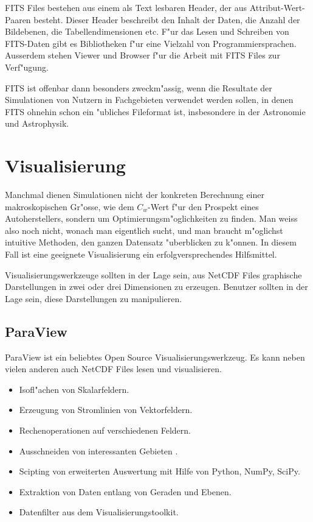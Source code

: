 FITS Files bestehen aus einem als Text lesbaren Header, der aus
Attribut-Wert-Paaren besteht.
Dieser Header beschreibt den Inhalt der Daten, die Anzahl der
Bildebenen, die Tabellendimensionen etc.
F"ur das Lesen und Schreiben von FITS-Daten gibt es Bibliotheken
f"ur eine Vielzahl von Programmiersprachen.
Ausserdem stehen Viewer und Browser f"ur die Arbeit mit FITS Files
zur Verf"ugung. 

FITS ist offenbar dann besonders zweckm"assig, wenn die Resultate
der Simulationen von Nutzern in Fachgebieten verwendet werden sollen,
in denen FITS ohnehin schon ein "ubliches Fileformat ist, insbesondere
in der Astronomie und Astrophysik.

\section{Visualisierung}
Manchmal dienen Simulationen nicht der konkreten Berechnung einer
makroskopischen Gr"osse, wie dem $C_w$-Wert f"ur den Prospekt eines
Autoherstellers, sondern um Optimierungsm"oglichkeiten zu finden.
Man weiss also noch nicht, wonach man eigentlich sucht, und man
braucht m"oglichst intuitive Methoden, den ganzen Datensatz
"uberblicken zu k"onnen.
In diesem Fall ist eine geeignete Visualisierung ein erfolgversprechendes
Hilfsmittel.

Visualisierungswerkzeuge sollten in der Lage sein, aus NetCDF Files
graphische Darstellungen in zwei oder drei Dimensionen zu erzeugen.
Benutzer sollten in der Lage sein, diese Darstellungen zu manipulieren.

\subsection{ParaView}
ParaView ist ein beliebtes Open Source Visualisierungswerkzeug.
Es kann neben vielen anderen auch NetCDF Files lesen und visualisieren.
\begin{itemize}
\item Isofl"achen von Skalarfeldern.
\item Erzeugung von Stromlinien von Vektorfeldern.
\item Rechenoperationen auf verschiedenen Feldern.
\item Ausschneiden von interessanten Gebieten .
\item Scipting von erweiterten Auswertung mit Hilfe von Python, NumPy, SciPy.
\item Extraktion von Daten entlang von Geraden und Ebenen.
\item Datenfilter aus dem Visualisierungstoolkit.
\end{itemize}

